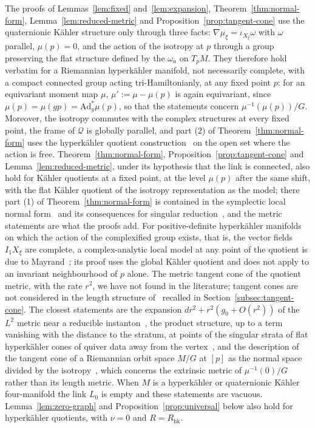 \begin{remark}\label{rem:hk}
The proofs of Lemmas~\ref{lem:fixed} and~\ref{lem:expansion}, Theorem~\ref{thm:normal-form},
Lemma~\ref{lem:reduced-metric} and Proposition~\ref{prop:tangent-cone} use the quaternionic K\"ahler
structure only through three facts: $\nabla\mu_\xi=\iota_{X_\xi}\omega$ with $\omega$ parallel,
$\mu(p)=0$, and the action of the isotropy at $p$ through a group preserving the flat structure defined
by the $\omega_a$ on $T_pM$. They therefore hold verbatim for a Riemannian hyperk\"ahler manifold, not
necessarily complete, with a compact connected group acting tri-Hamiltonianly, at any fixed point $p$:
for an equivariant moment map $\mu$, $\mu':=\mu-\mu(p)$ is again equivariant, since $\mu(p)=\mu(gp)=\mathrm{Ad}^*_g\mu(p)$, so that the statements concern $\mu^{-1}(\mu(p))/G$. Moreover, the isotropy commutes with the complex structures at
every fixed point, the frame of $\mathcal Q$ is globally parallel, and part (2) of
Theorem~\ref{thm:normal-form} uses the hyperk\"ahler quotient
construction~\cite{HitchinKLR:1987} on the open set where the action is free. Theorem~\ref{thm:normal-form},
Proposition~\ref{prop:tangent-cone} and Lemma~\ref{lem:reduced-metric}, under its hypothesis that the
link is connected, also hold for K\"ahler quotients at a fixed point, at the level $\mu(p)$ after the same
shift, with the flat K\"ahler quotient of
the isotropy representation as the model; there part (1) of Theorem~\ref{thm:normal-form} is contained in the
symplectic local normal form~\cite{Marle:1985,GuilleminSternberg:1984} and its consequences for singular
reduction~\cite{SjamaarLerman:1991}, and the metric statements are what the proofs add. For positive-definite hyperk\"ahler manifolds on which the action of the complexified group
exists, that is, the vector fields $I_1X_\xi$ are complete, a complex-analytic local model at any point of the quotient is due to
Mayrand~\cite[Thm.~1.4]{Mayrand:2022}; its proof uses the global K\"ahler quotient and does not apply to an
invariant neighbourhood of $p$ alone. The metric tangent cone of the quotient metric, with the rate $r^2$, we
have not found in the literature; tangent cones are not considered in the length structure
of~\cite[Sect.~7]{DancerSwann:1997} recalled in Section~\ref{subsec:tangent-cone}. The closest statements are the expansion
$dr^2+r^2(g_0+O(r^2))$ of the $L^2$ metric near a reducible
instanton~\cite[Thm.~I; cf.\ Thm.~2.8]{GroisserParker:1989}, the product structure, up to a term vanishing
with the distance to the stratum, at points of the singular strata of flat hyperk\"ahler cones of quiver
data away from the vertex~\cite{DimakisRochon:2024}, and the description of the tangent cone of a
Riemannian orbit space $M/G$ at $[p]$ as the normal space divided by the
isotropy~\cite[Sect.~2]{Spindeler:2015}, which concerns the extrinsic metric of $\mu^{-1}(0)/G$ rather
than its length metric. When $M$ is a hyperk\"ahler or quaternionic K\"ahler four-manifold the link $L_0$ is empty and these
statements are vacuous. Lemma~\ref{lem:zero-graph}
and Proposition~\ref{prop:universal} below also hold for hyperk\"ahler quotients, with $\nu=0$ and
$R=R_{\mathrm{hk}}$.
\end{remark}

